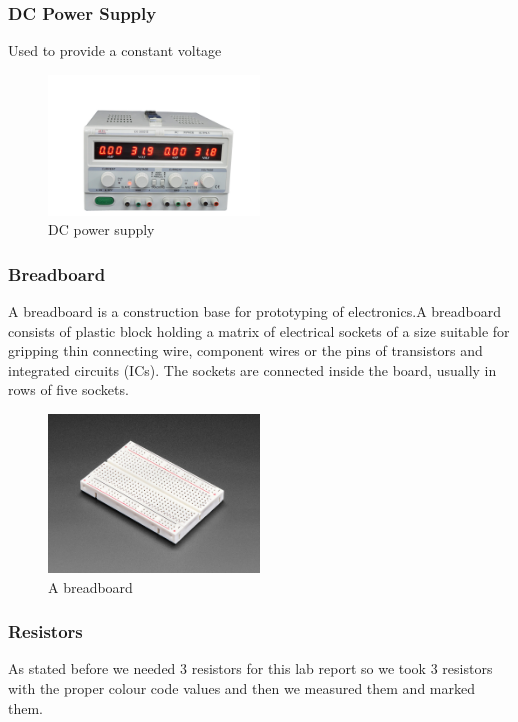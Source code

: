 \documentclass[a4paper, 10pt]{article}
\begin{document}
			\pagebreak
			\subsubsection{DC Power Supply}
				Used to provide a constant voltage
				\begin{figure}[h!]
					\centering
					\includegraphics[width=0.5\textwidth]{./images/DC-PowerSupply.jpeg}
					\caption{DC power supply}
					\label{fig:DCPowerSupply}
				\end{figure}

			\subsubsection{Breadboard}
				A breadboard is a construction base for prototyping of electronics.A breadboard consists of plastic block holding a matrix of electrical sockets of a size suitable for gripping thin connecting wire, 
				component wires or the pins of transistors and integrated circuits (ICs). The sockets are connected inside the board, usually in rows of five sockets.

				\begin{figure}[h!]
					\centering
					\includegraphics[width=0.5\textwidth]{images/breadboard.jpeg}
					\caption{A breadboard}
					\label{fig:breadboard}
				\end{figure}
			
			\pagebreak
			\subsubsection{Resistors}
				As stated before we needed 3 resistors for this lab report so we took 3 resistors with the proper colour code values and then we measured them and marked them.
\end{document}
